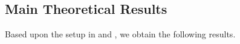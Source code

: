 \subsection{Main Theoretical Results}





Based upon the setup in  and , we obtain the following results.

